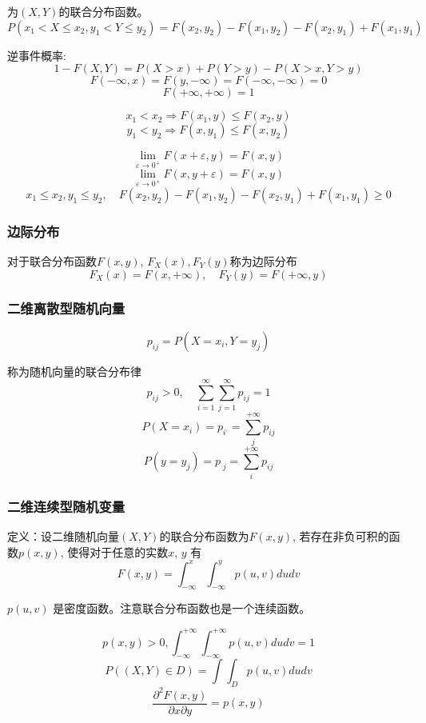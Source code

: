 \documentclass[10pt, a4paper]{article}
\begin{document}
            为$(X, Y)$的联合分布函数。
            $$P(x_1 < X \leqslant x_2, y_1 < Y \leqslant y_2) = F(x_2, y_2) - F(x_1, y_2) - F(x_2, y_1) + F(x_1, y_1)$$

            逆事件概率:
            $$1 - F(X, Y) = P(X > x) + P(Y > y) - P(X > x, Y > y)$$
            $$F(-\infty, x) = F(y, -\infty) = F(-\infty, -\infty) = 0$$
            $$F(+\infty, +\infty) = 1$$

            $$x_1 < x_2 \Rightarrow F(x_1, y) \leqslant F(x_2, y)$$
            $$y_1 < y_2 \Rightarrow F(x, y_1) \leqslant F(x, y_2)$$

            $$\lim_{\varepsilon \rightarrow 0^+}F(x + \varepsilon, y) = F(x, y)$$
            $$\lim_{\varepsilon \rightarrow 0^+}F(x, y + \varepsilon) = F(x, y)$$
            $$x_1\leqslant x_2, y_1 \leqslant y_2, \quad F(x_2, y_2) - F(x_1, y_2) - F(x_2, y_1) + F(x_1, y_1) \geqslant 0$$
        
        \subsubsection{边际分布}
            对于联合分布函数$F(x, y)$, $F_X(x), F_Y(y)$称为边际分布 
                $$F_X(x) = F(x, +\infty),\quad F_Y(y) = F(+\infty, y)$$
        \subsubsection{二维离散型随机向量}
            $$p_{ij} = P(X = x_i, Y = y_j)$$
            
            称为随机向量的联合分布律
            $$p_{ij} > 0,\quad\sum_{i = 1}^{\infty}\sum_{j = 1}^{\infty}p_{ij} = 1$$
            $$P(X = x_i) = p_{i^{.}} = \sum_{j}^{+\infty}p_{ij}$$
            $$P(y = y_j) = p_{^{.}j} = \sum_{i}^{+\infty}p_{ij}$$



        \subsubsection{二维连续型随机变量}
            定义：设二维随机向量$(X, Y)$的联合分布函数为$F(x, y)$, 若存在非负可积的函数$p(x, y)$, 使得对于任意的实数$x$, $y$ 有
            $$F(x, y) = \int_{-\infty}^x\int_{-\infty}^y p(u, v)dudv$$
            
            $p(u, v)$ 是密度函数。注意联合分布函数也是一个连续函数。 
        
            $$p(x, y) > 0, \int_{-\infty}^{+\infty}\int_{-\infty}^{+\infty}p(u, v)dudv = 1$$
            $$P((X, Y) \in D) = \int\int_Dp(u, v)dudv$$
            $$\frac{\partial^2 F(x, y)}{\partial x\partial y} = p(x, y)$$
    
\end{document}
